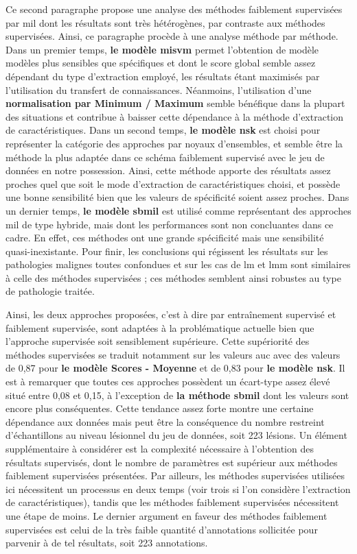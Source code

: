 Ce second paragraphe propose une analyse des méthodes faiblement supervisées par \gls{mil} dont les résultats sont très hétérogènes, par contraste aux méthodes supervisées. Ainsi, ce paragraphe procède à une analyse méthode par méthode. Dans un premier temps, \textbf{le modèle \gls{misvm}} permet l'obtention de modèle modèles plus sensibles que spécifiques et dont le score global semble assez dépendant du type d'extraction employé, les résultats étant maximisés par l'utilisation du transfert de connaissances. Néanmoins, l'utilisation d'une \textbf{normalisation par Minimum / Maximum} semble bénéfique dans la plupart des situations et contribue à baisser cette dépendance à la méthode d'extraction de caractéristiques. Dans un second temps, \textbf{le modèle \gls{nsk}} est choisi pour représenter la catégorie des approches par noyaux d'ensembles, et semble être la méthode la plus adaptée dans ce schéma faiblement supervisé avec le jeu de données en notre possession. Ainsi, cette méthode apporte des résultats assez proches quel que soit le mode d'extraction de caractéristiques choisi, et possède une bonne sensibilité bien que les valeurs de spécificité soient assez proches. Dans un dernier temps, \textbf{le modèle \gls{sbmil}} est utilisé comme représentant des approches \gls{mil} de type hybride, mais dont les performances sont non concluantes dans ce cadre. En effet, ces méthodes ont une grande spécificité mais une sensibilité quasi-inexistante. Pour finir, les conclusions qui régissent les résultats sur les pathologies malignes toutes confondues et sur les cas de \gls{lm} et \gls{lmm} sont similaires à celle des méthodes supervisées ; ces méthodes semblent ainsi robustes au type de pathologie traitée.\par

Ainsi, les deux approches proposées, c'est à dire par entraînement supervisé et faiblement supervisée, sont adaptées à la problématique actuelle bien que l'approche supervisée soit sensiblement supérieure. Cette supériorité des méthodes supervisées se traduit notamment sur les valeurs \gls{auc} avec des valeurs de 0,87 pour \textbf{le modèle Scores - Moyenne} et de 0,83 pour \textbf{le modèle \gls{nsk}}. Il est à remarquer que toutes ces approches possèdent un écart-type assez élevé situé entre 0,08 et 0,15, à l'exception de \textbf{la méthode \gls{sbmil}} dont les valeurs sont encore plus conséquentes. Cette tendance assez forte montre une certaine dépendance aux données mais peut être la conséquence du nombre restreint d'échantillons au niveau lésionnel du jeu de données, soit 223 lésions. Un élément supplémentaire à considérer est la complexité nécessaire à l'obtention des résultats supervisés, dont le nombre de paramètres est supérieur aux méthodes faiblement supervisées présentées. Par ailleurs, les méthodes supervisées utilisées ici nécessitent un processus en deux temps (voir trois si l'on considère l'extraction de caractéristiques), tandis que les méthodes faiblement supervisées nécessitent une étape de moins. Le dernier argument en faveur des méthodes faiblement supervisées est celui de la très faible quantité d'annotations sollicitée pour parvenir à de tel résultats, soit 223 annotations.\par

